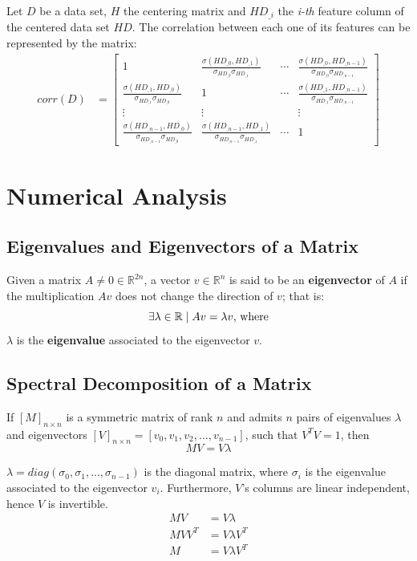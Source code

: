 \documentclass[12pt]{report}
\begin{document}
Let $D$ be a data set, $H$ the centering matrix and $HD_{\_i}$ the {\em i-th} feature column of the centered data set $HD$. The correlation between each one of its features can be represented by the matrix:
\begin{align*}
	corr(D) &= \begin{bmatrix}
		1 & \frac{\sigma(HD_{\_0}, HD_{\_1})}{\sigma_{HD_{\_0}} \sigma_{HD_{\_1}}} & \cdots & \frac{\sigma(HD_{\_0}, HD_{\_n-1})}{\sigma_{HD_{\_0}} \sigma_{HD_{\_n-1}}} \\
		\frac{\sigma(HD_{\_1}, HD_{\_0})}{\sigma_{HD_{\_1}} \sigma_{HD_{\_0}}} & 1 & \cdots & \frac{\sigma(HD_{\_1}, HD_{\_n-1})}{\sigma_{HD_{\_1}} \sigma_{HD_{\_n-1}}} \\
		\vdots & \vdots && \vdots \\
		\frac{\sigma(HD_{\_n-1}, HD_{\_0})}{\sigma_{HD_{\_n-1}} \sigma_{HD_{\_0}}} & \frac{\sigma(HD_{\_n-1}, HD_{\_1})}{\sigma_{HD_{\_n-1}} \sigma_{HD_{\_1}}} & \cdots & 1
	\end{bmatrix}
\end{align*}

\section{Numerical Analysis}
\subsection{Eigenvalues and Eigenvectors of a Matrix}

Given a matrix $A \ne 0 \in \mathbb{R}^{2n}$, a vector $v \in \mathbb{R}^n$ is said to be an \textbf{eigenvector} of $A$ if the multiplication $Av$ does not change the direction of $v$; that is:
$$\exists \lambda \in \mathbb{R} \mid Av = \lambda v \textnormal{, where}$$
$\lambda$ is the \textbf{eigenvalue} associated to the eigenvector $v$.

\subsection{Spectral Decomposition of a Matrix}

If $[M]_{n\times n}$ is a symmetric matrix of rank $n$ and admits $n$ pairs of eigenvalues $\lambda$ and eigenvectors $[V]_{n\times n} = [v_0, v_1, v_2, ..., v_{n-1}]$, such that $V^TV = 1$, then
$$MV = V \lambda$$

$\lambda = diag(\sigma_0, \sigma_1, ..., \sigma_{n-1})$ is the diagonal matrix, where $\sigma_i$ is the eigenvalue associated to the eigenvector $v_i$. \cite{cox2001} Furthermore, $V$'s columns are linear independent, hence $V$ is invertible.
\begin{align*}
	MV &= V \lambda \\
	MVV^T &= V \lambda V^T \\
	M &= V \lambda V^T
\end{align*}
\end{document}
